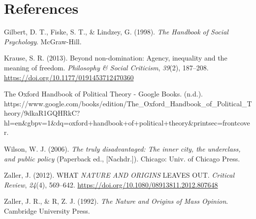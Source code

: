 \documentclass[
  english,
  man]{apa6}
\begin{document}
\newpage

\hypertarget{references}{%
\section{References}\label{references}}

\begingroup
\setlength{\parindent}{-0.5in}
\setlength{\leftskip}{0.5in}

\hypertarget{refs}{}
\leavevmode\hypertarget{ref-gilbertHandbookSocialPsychology1998}{}%
Gilbert, D. T., Fiske, S. T., \& Lindzey, G. (1998). \emph{The Handbook of Social Psychology}. McGraw-Hill.

\leavevmode\hypertarget{ref-krauseNondominationAgencyInequality2013}{}%
Krause, S. R. (2013). Beyond non-domination: Agency, inequality and the meaning of freedom. \emph{Philosophy \& Social Criticism}, \emph{39}(2), 187--208. \url{https://doi.org/10.1177/0191453712470360}

\leavevmode\hypertarget{ref-OxfordHandbookPolitical}{}%
The Oxford Handbook of Political Theory - Google Books. (n.d.). https://www.google.com/books/edition/The\_Oxford\_Handbook\_of\_Political\_Theory/9dkaR1GQHRkC?hl=en\&gbpv=1\&dq=oxford+handbook+of+political+theory\&printsec=frontcover.

\leavevmode\hypertarget{ref-wilsonTrulyDisadvantagedInner2006}{}%
Wilson, W. J. (2006). \emph{The truly disadvantaged: The inner city, the underclass, and public policy} (Paperback ed., {[}Nachdr.{]}). Chicago: Univ. of Chicago Press.

\leavevmode\hypertarget{ref-zallerWHATNATUREORIGINS2012}{}%
Zaller, J. (2012). WHAT \emph{NATURE AND ORIGINS} LEAVES OUT. \emph{Critical Review}, \emph{24}(4), 569--642. \url{https://doi.org/10.1080/08913811.2012.807648}

\leavevmode\hypertarget{ref-zallerNatureOriginsMass1992}{}%
Zaller, J. R., \& R, Z. J. (1992). \emph{The Nature and Origins of Mass Opinion}. Cambridge University Press.

\endgroup
\end{document}
